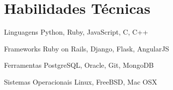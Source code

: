 \documentclass{tccv}
\begin{document}
\section{Habilidades Técnicas}

\begin{factlist}

\item{Linguagens}
     {Python, Ruby, JavaScript, C, C++}
     
\item{Frameworks}
     {Ruby on Rails, Django, Flask, AngularJS}

\item{Ferramentas}
     {PostgreSQL, Oracle, Git, MongoDB}

\item{Sistemas Operacionais}
     {Linux, FreeBSD, Mac OSX}

\end{factlist}
\end{document}
